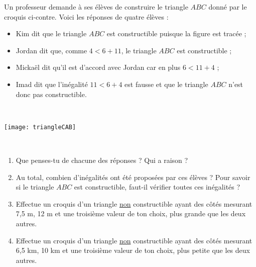 \begin{activite}
Un professeur demande à ses élèves de construire le triangle $ABC$ donné par le croquis ci-contre. Voici les réponses de quatre élèves : \\[1em]
\begin{minipage}[t]{0.46\textwidth}
\begin{itemize}
 \item Kim dit que le triangle $ABC$ est constructible puisque la figure est tracée ;
 \item Jordan dit que, comme $4 < 6 + 11$,  le triangle $ABC$ est constructible ;
 \item Mickaël dit qu'il est d'accord avec Jordan car en plus $6 < 11 + 4$ ;
 \item Imad dit que l'inégalité $11 < 6 + 4$ est fausse et que le triangle $ABC$ n'est donc pas constructible.
 \end{itemize}
\end{minipage} \hfill%
\begin{minipage}[t]{0.36\textwidth}
\hfill \\
\begin{center} \texttt{[image: triangleCAB]} \end{center}
\end{minipage} \\

\begin{enumerate}
\item Que penses-tu de chacune des réponses ? Qui a raison ?

\item Au total, combien d'inégalités ont été proposées par ces élèves ? Pour savoir si le triangle $ABC$ est constructible, faut-il vérifier toutes ces inégalités ?
   
\item Effectue un croquis d'un triangle \underline{non} constructible ayant des côtés mesurant 7,5 m, 12 m et une troisième valeur de ton choix, plus grande que les deux autres.
         
\item Effectue un croquis d'un triangle \underline{non} constructible ayant des côtés mesurant 6,5 km, 10 km et une troisième valeur de ton choix, plus petite que les deux autres.
\end{enumerate}

\end{activite}



